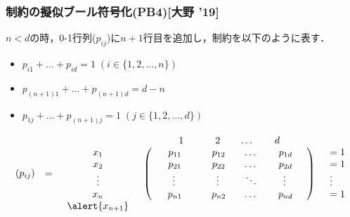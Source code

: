 \begin{frame}
    \frametitle{{\alldiff}制約の擬似ブール符号化(PB4)[大野 '19]}
    \begin{exampleblock}{}
        $n<d$の時，0-1行列($p_{ij}$)に$n+1$行目を追加し，{\alldifferent}制約を以下のように表す．
        \begin{itemize}
            \item $p_{i1} + \dots + p_{id} = 1 \; (i \in \{1,2,\ldots,n\})$
            \item $p_{(n+1)1} + \dots + p_{(n+1)d} = d-n$
            \item $p_{1j} + \dots + p_{(n+1)j} = 1 \; (j \in \{1,2,\ldots,d\})$
        \end{itemize}
        \begin{displaymath}
            \begin{array}{ccccc}
             & & & \begin{array}{cccc}  \;\;\;\;1\;\;\;\;&\;\;\;\;2\;\;\;\;&\dots&\;\;\;\;d\;\;\;\; \end{array}&\\
                (p_{ij})&=&
                \begin{array}{c}x_1\\ x_2\\ \vdots\\ x_n \end{array}&
                \left(
                    \begin{array}{cccc}
                        \;\;\;\;p_{11\;\;\;\;}&\;\;\;\;p_{12\;\;\;\;}&\dots&\;\;\;\;p_{1d\;\;\;\;}\\
                        \;\;\;\;p_{21\;\;\;\;}&\;\;\;\;p_{22\;\;\;\;}&\dots&\;\;\;\;p_{2d\;\;\;\;}\\
                        \;\;\;\;\vdots\;\;\;\;&\;\;\;\;\vdots\;\;\;\;&\ddots&\;\;\;\;\vdots\;\;\;\;\\
                        \;\;\;\;p_{n1\;\;\;\;}&\;\;\;\;p_{n2\;\;\;\;}&\dots&\;\;\;\;p_{nd\;\;\;\;}
                \end{array}\right)&
                \begin{array}{l} = 1\\ = 1\\ \vdots\\ = 1  \end{array}\\
                                                                    & & \begin{array}{c}\alert{x_{n+1}}\\ \\ \\ \end{array}& \begin{array}{cccc}  

\end{array}
\end{array}
\end{displaymath}
\end{exampleblock}
\end{frame}
